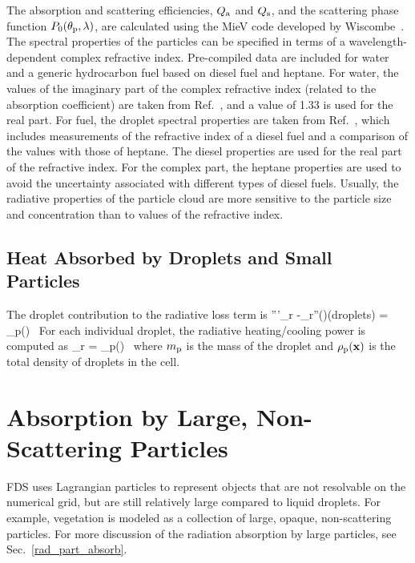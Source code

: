 The absorption and scattering efficiencies, $Q_{\rm a}$ and $Q_{\rm s}$, and the scattering phase function $P_0(\theta_{\rm p},\lambda)$, are calculated using the MieV code developed by Wiscombe~\cite{Wiscombe}. The spectral properties of the particles can be specified in terms of a wavelength-dependent complex refractive index. Pre-compiled data are included for water and a generic hydrocarbon fuel based on diesel fuel and heptane. For water, the values of the imaginary part of the complex refractive index (related to the absorption coefficient) are taken from Ref.~\cite{Hale:1}, and a value of 1.33 is used for the real part. For fuel, the droplet spectral properties are taken from Ref.~\cite{Dombrovsky:1}, which includes measurements of the refractive index of a diesel fuel and a comparison of the values with those of heptane. The diesel properties are used for the real part of the refractive index. For the complex part, the heptane properties are used to avoid the uncertainty associated with different types of diesel fuels. Usually, the radiative properties of the particle cloud are more sensitive to the particle size and concentration than to values of the refractive index.



\subsection{Heat Absorbed by Droplets and Small Particles}

The droplet contribution to the radiative loss term is
\be {}'''_{\rm r} \equiv -\nabla\!\cdot \dbq_{\rm r}''(\bx)(\mbox{droplets}) =
    \kappa_{\rm p}(\bx) \, \left[ U(\bx) - 4 \pi \, I_{{\rm b,p}}(\bx) \right]
\ee
For each individual droplet, the radiative heating/cooling power is computed as
\be
\dq_{\rm r} = 
    \kappa_{\rm p}(\bx) \, \left[ U(\bx) - 4\pi \, I_{{\rm b,p}}(\bx) \right]
\ee
where $m_{\rm p}$ is the mass of the droplet and $\rho_{\rm p}({\mathbf{x}})$ is the total density of droplets in the cell.



\section{Absorption by Large, Non-Scattering Particles}

FDS uses Lagrangian particles to represent objects that are not resolvable on the numerical grid, but are still relatively large compared to liquid droplets. For example, vegetation is modeled as a collection of large, opaque, non-scattering particles. For more discussion of the radiation absorption by large particles, see Sec.~\ref{rad_part_absorb}.








